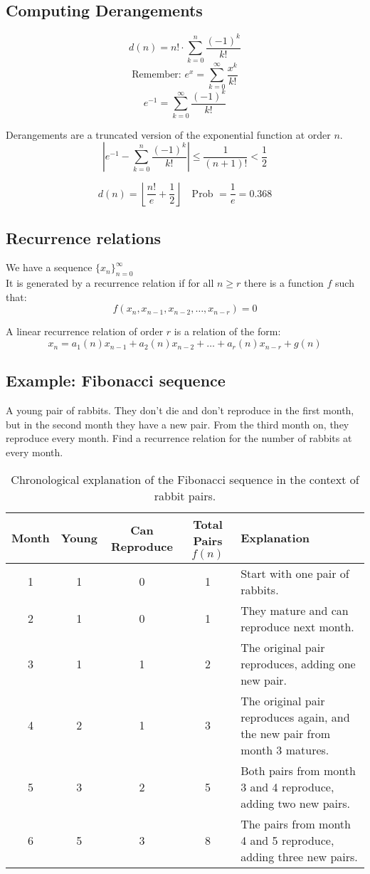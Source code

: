 \documentclass[11pt]{article}
\begin{document}
\subsection*{Computing Derangements}
\[
d(n) = n! \cdot \sum_{k=0}^{n} \frac{(-1)^k}{k!}
\]
\[
\text{Remember: } e^x = \sum_{k=0}^{\infty} \frac{x^k}{k!}
\]
\[
e^{-1} = \sum_{k=0}^{\infty} \frac{(-1)^k}{k!}
\]

Derangements are a truncated version of the exponential function at order $n$.
\[
\left| e^{-1} - \sum_{k=0}^{n} \frac{(-1)^k}{k!} \right| \leq \frac{1}{(n+1)!} < \frac{1}{2}
\]

\[
d(n) = \left\lfloor \frac{n!}{e} + \frac{1}{2} \right\rfloor \quad \text{Prob } = \frac{1}{e} = 0.368 
\]

\subsection{Recurrence relations}
We have a sequence $\{ x_n \}_{n = 0}^{\infty}$ \\
It is generated by a recurrence relation if for all $n \geq r$ there is a function $f$ such that:
\[
f(x_n, x_{n-1}, x_{n-2}, \dots, x_{n-r}) = 0
\]

A linear recurrence relation of order $r$ is a relation of the form:
\[
x_n = a_1(n) x_{n-1} + a_2(n) x_{n-2} + \dots + a_r(n) x_{n-r} + g(n)
\]

\subsection*{Example: Fibonacci sequence}
A young pair of rabbits. They don't die and don't reproduce in the first month, but in the second month they have a new pair. From the third month on, they reproduce every month. Find a recurrence relation for the number of rabbits at every month.

\begin{table}[!ht]
\begin{tabular}{|c|c|c|c|p{5cm}|}
\hline
\textbf{Month} & \textbf{Young} & \textbf{Can Reproduce} & \textbf{Total Pairs} $f(n)$ & \textbf{Explanation} \\
\hline
1 & 1 & 0 & 1 & Start with one pair of rabbits. \\
2 & 1 & 0 & 1 & They mature and can reproduce next month. \\
3 & 1 & 1 & 2 & The original pair reproduces, adding one new pair. \\
4 & 2 & 1 & 3 & The original pair reproduces again, and the new pair from month 3 matures. \\
5 & 3 & 2 & 5 & Both pairs from month 3 and 4 reproduce, adding two new pairs. \\
6 & 5 & 3 & 8 & The pairs from month 4 and 5 reproduce, adding three new pairs. \\
\hline
\end{tabular}
\caption{Chronological explanation of the Fibonacci sequence in the context of rabbit pairs.}
\end{table}
\end{document}
